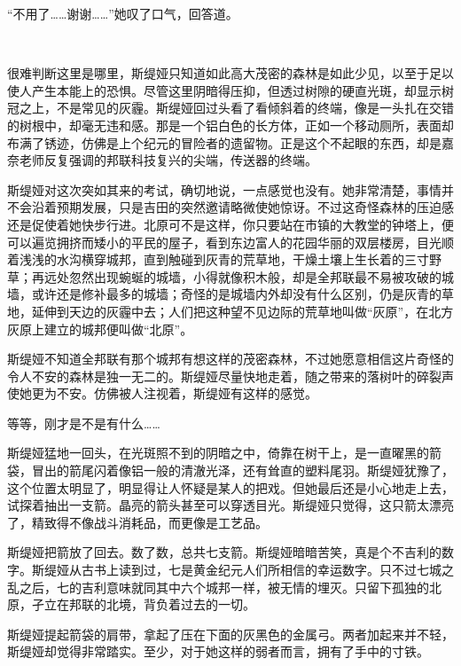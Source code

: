 \documentclass[a5paper, punct=kaiming, fontset=founder]{ctexart}
\begin{document}
“不用了……谢谢……”她叹了口气，回答道。

\ %

很难判断这里是哪里，斯缇娅只知道如此高大茂密的森林是如此少见，以至于足以使人产生本能上的恐惧。尽管这里阴暗得压抑，但透过树隙的硬直光斑，却显示树冠之上，不是常见的灰霾。斯缇娅回过头看了看倾斜着的终端，像是一头扎在交错的树根中，却毫无违和感。那是一个铝白色的长方体，正如一个移动厕所，表面却布满了锈迹，仿佛是上个纪元的冒险者的遗留物。正是这个不起眼的东西，却是嘉奈老师反复强调的邦联科技复兴的尖端，传送器的终端。

斯缇娅对这次突如其来的考试，确切地说，一点感觉也没有。她非常清楚，事情并不会沿着预期发展，只是吉田的突然邀请略微使她惊讶。不过这奇怪森林的压迫感还是促使着她快步行进。北原可不是这样，你只要站在市镇的大教堂的钟塔上，便可以遍览拥挤而矮小的平民的屋子，看到东边富人的花园华丽的双层楼房，目光顺着浅浅的水沟横穿城邦，直到触碰到灰青的荒草地，干燥土壤上生长着的三寸野草；再远处忽然出现蜿蜒的城墙，小得就像积木般，却是全邦联最不易被攻破的城墙，或许还是修补最多的城墙；奇怪的是城墙内外却没有什么区别，仍是灰青的草地，延伸到天边的灰霾中去；人们把这种望不见边际的荒草地叫做“灰原”，在北方灰原上建立的城邦便叫做“北原”。

斯缇娅不知道全邦联有那个城邦有想这样的茂密森林，不过她愿意相信这片奇怪的令人不安的森林是独一无二的。斯缇娅尽量快地走着，随之带来的落树叶的碎裂声使她更为不安。仿佛被人注视着，斯缇娅有这样的感觉。

等等，刚才是不是有什么……

斯缇娅猛地一回头，在光斑照不到的阴暗之中，倚靠在树干上，是一直曜黑的箭袋，冒出的箭尾闪着像铝一般的清澈光泽，还有耸直的塑料尾羽。斯缇娅犹豫了，这个位置太明显了，明显得让人怀疑是某人的把戏。但她最后还是小心地走上去，试探着抽出一支箭。晶亮的箭头甚至可以穿透目光。斯缇娅只觉得，这只箭太漂亮了，精致得不像战斗消耗品，而更像是工艺品。

斯缇娅把箭放了回去。数了数，总共七支箭。斯缇娅暗暗苦笑，真是个不吉利的数字。斯缇娅从古书上读到过，七是黄金纪元人们所相信的幸运数字。只不过七城之乱之后，七的吉利意味就同其中六个城邦一样，被无情的埋灭。只留下孤独的北原，孑立在邦联的北境，背负着过去的一切。

斯缇娅提起箭袋的肩带，拿起了压在下面的灰黑色的金属弓。两者加起来并不轻，斯缇娅却觉得非常踏实。至少，对于她这样的弱者而言，拥有了手中的寸铁。
\end{document}
